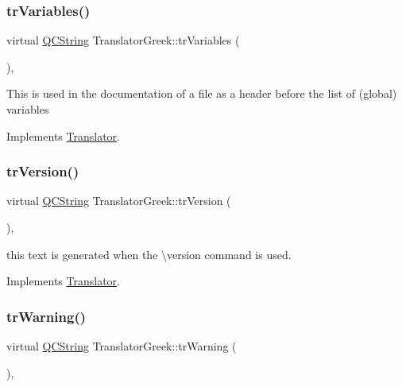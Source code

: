 \mbox{\label{class_translator_greek_ac66d1f4971d580d34fa95c8f5429bc8b}} 
\subsubsection{\texorpdfstring{trVariables()}{trVariables()}}
{\footnotesize\ttfamily virtual \mbox{\hyperlink{class_q_c_string}{Q\+C\+String}} Translator\+Greek\+::tr\+Variables (\begin{DoxyParamCaption}{ }\end{DoxyParamCaption})\hspace{0.3cm}{\ttfamily [inline]}, {\ttfamily [virtual]}}

This is used in the documentation of a file as a header before the list of (global) variables 

Implements \mbox{\hyperlink{class_translator}{Translator}}.

\mbox{\label{class_translator_greek_a32b03703244deaf8a9221b5428f41f57}} 
\subsubsection{\texorpdfstring{trVersion()}{trVersion()}}
{\footnotesize\ttfamily virtual \mbox{\hyperlink{class_q_c_string}{Q\+C\+String}} Translator\+Greek\+::tr\+Version (\begin{DoxyParamCaption}{ }\end{DoxyParamCaption})\hspace{0.3cm}{\ttfamily [inline]}, {\ttfamily [virtual]}}

this text is generated when the \textbackslash{}version command is used. 

Implements \mbox{\hyperlink{class_translator}{Translator}}.

\mbox{\label{class_translator_greek_a82cf5aab5f2ce247f5911eba5ddce2fb}} 
\subsubsection{\texorpdfstring{trWarning()}{trWarning()}}
{\footnotesize\ttfamily virtual \mbox{\hyperlink{class_q_c_string}{Q\+C\+String}} Translator\+Greek\+::tr\+Warning (\begin{DoxyParamCaption}{ }\end{DoxyParamCaption})\hspace{0.3cm}{\ttfamily [inline]}, {\ttfamily [virtual]}}

